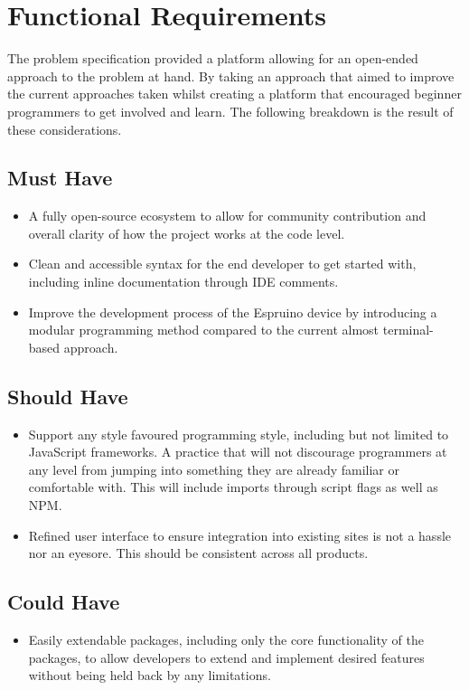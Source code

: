 \documentclass{l4proj}
\begin{document}
\section{Functional Requirements}
The problem specification provided a platform allowing for an open-ended approach to the problem at hand. By taking an approach that aimed to improve the current approaches taken whilst creating a platform that encouraged beginner programmers to get involved and learn. The following breakdown is the result of these considerations.
\subsection{Must Have}
\begin{itemize}
    \item A fully open-source ecosystem to allow for community contribution and overall clarity of how the project works at the code level.
    \item Clean and accessible syntax for the end developer to get started with, including inline documentation through IDE comments.
    \item Improve the development process of the Espruino device by introducing a modular programming method compared to the current almost terminal-based approach.
\end{itemize}
\subsection{Should Have}
\begin{itemize}
    \item Support any style favoured programming style, including but not limited to JavaScript frameworks. A practice that will not discourage programmers at any level from jumping into something they are already familiar or comfortable with. This will include imports through script flags as well as NPM.
    \item Refined user interface to ensure integration into existing sites is not a hassle nor an eyesore. This should be consistent across all products.
\end{itemize}
\subsection{Could Have}
\begin{itemize}
    \item Easily extendable packages, including only the core functionality of the packages, to allow developers to extend and implement desired features without being held back by any limitations.
\end{itemize}
\end{document}
